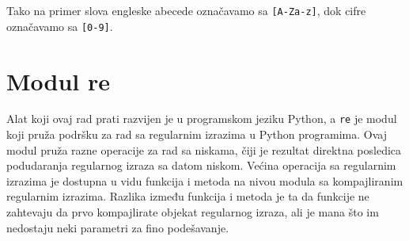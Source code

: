 \documentclass[12pt,oneside]{memoir}
\theoremstyle{plain}
\theoremstyle{definition}
\begin{document}
Tako na primer slova engleske abecede označavamo sa \texttt{[A-Za-z]}, dok cifre označavamo sa \texttt{[0-9]}.
 
\section{Modul re}

Alat koji ovaj rad prati razvijen je u programskom jeziku Python, a \texttt{re} je modul koji pruža podršku za rad sa regularnim izrazima u Python programima. Ovaj modul pruža razne operacije za rad sa niskama, čiji je rezultat direktna posledica podudaranja regularnog izraza sa datom niskom. Većina operacija sa regularnim izrazima je dostupna u vidu funkcija i metoda na nivou modula sa kompajliranim regularnim izrazima. Razlika između funkcija i metoda je ta da funkcije ne zahtevaju da prvo kompajlirate objekat regularnog izraza, ali je mana što im nedostaju neki parametri za fino podešavanje. 
\end{document}
